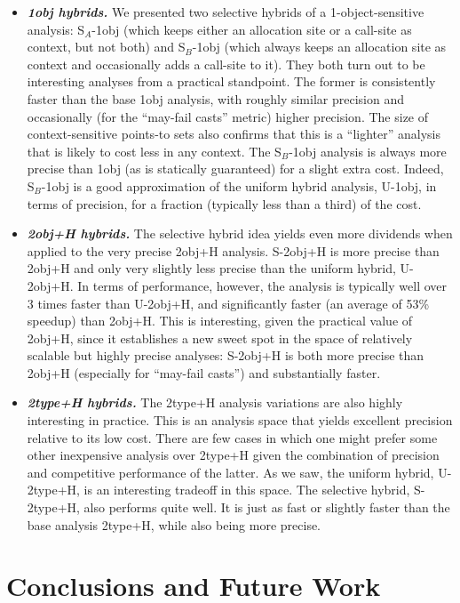 \begin{itemize}
\item \textbf{\emph{1obj hybrids.}}
We presented two selective hybrids of a 1-object-sensitive analysis: S$_A$-1obj (which keeps either an allocation site or a call-site as context, but not both) and S$_B$-1obj (which always keeps an allocation site as context and occasionally adds a call-site to it). They both turn out to be interesting analyses from a practical standpoint. The former is consistently faster than the base 1obj analysis, with roughly similar precision and occasionally (for the ``may-fail casts'' metric) higher precision. The size of context-sensitive points-to sets also confirms that this is a ``lighter'' analysis that is likely to cost less in any context. The S$_B$-1obj analysis is always more precise than 1obj (as is statically guaranteed) for a slight extra cost. Indeed, S$_B$-1obj is a good approximation of the uniform hybrid analysis, U-1obj, in terms of precision, for a fraction (typically less than a third) of the cost.

\item \textbf{\emph{2obj+H hybrids.}}
The selective hybrid idea yields even more dividends when applied to the very precise 2obj+H analysis. S-2obj+H is more precise than 2obj+H and only very slightly less precise than the uniform hybrid, U-2obj+H. In terms of performance, however, the analysis is typically well over 3 times faster than U-2obj+H, and significantly faster (an average of 53\% speedup) than 2obj+H. This is interesting, given the practical value of 2obj+H, since it establishes a new sweet spot in the space of relatively scalable but highly precise analyses: S-2obj+H is both more precise than 2obj+H (especially for ``may-fail casts'') and substantially faster.

\item \textbf{\emph{2type+H hybrids.}}
The 2type+H analysis variations are also highly interesting in practice. This is an analysis space that yields excellent precision relative to its low cost. There are few cases in which one might prefer some other inexpensive analysis over 2type+H given the combination of precision and competitive performance of the latter. As we saw, the uniform hybrid, U-2type+H, is an interesting tradeoff in this space. The selective hybrid, S-2type+H, also performs quite well. It is just as fast or slightly faster than the base analysis 2type+H, while also being more precise.
\end{itemize}


\section{Conclusions and Future Work}

